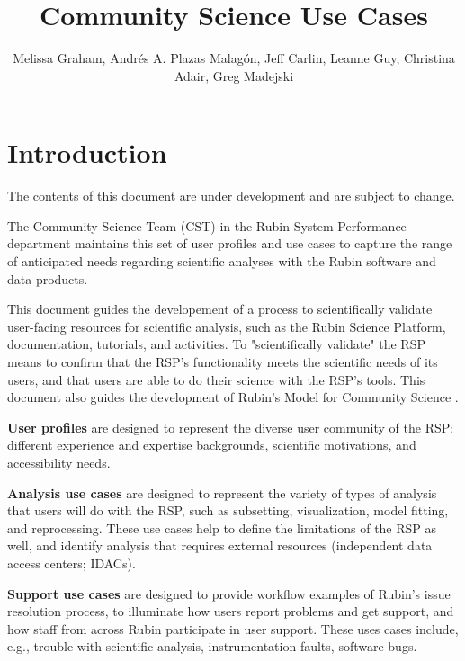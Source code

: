 \documentclass[DM,lsstdraft,authoryear,toc]{lsstdoc}
\title{Community Science Use Cases}
\author{%
Melissa Graham, Andrés A. Plazas Malagón, Jeff Carlin, Leanne Guy, Christina Adair, Greg Madejski
}
\date{\vcsDate}
\begin{document}
\maketitle


\section{Introduction}

The contents of this document are under development and are subject to change.

The Community Science Team (CST) in the Rubin System Performance department maintains this set of user profiles and use cases
to capture the range of anticipated needs regarding scientific analyses with the Rubin software and data products.

This document guides the developement of a process to scientifically validate user-facing resources for scientific analysis,
such as the Rubin Science Platform, documentation, tutorials, and activities.
To "scientifically validate" the RSP means to confirm that the RSP's functionality meets the scientific needs
of its users, and that users are able to do their science with the RSP's tools.
This document also guides the development of Rubin's Model for Community Science .

\textbf{User profiles} are designed to represent the diverse user community of the RSP:
different experience and expertise backgrounds, scientific motivations, and accessibility needs.

\textbf{Analysis use cases} are designed to represent the variety of types of analysis that
users will do with the RSP, such as subsetting, visualization, model fitting, and reprocessing.
These use cases help to define the limitations of the RSP as well, and identify analysis
that requires external resources (independent data access centers; IDACs).

\textbf{Support use cases} are designed to provide workflow examples of Rubin's issue resolution
process, to illuminate how users report problems and get support, and how staff from across
Rubin participate in user support.
These uses cases include, e.g., trouble with scientific analysis,
instrumentation faults, software bugs.
\end{document}
